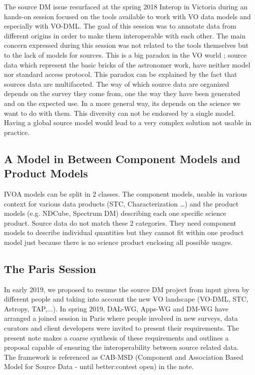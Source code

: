 \documentclass[11pt,a4paper]{ivoa}
\begin{document}
The source DM issue resurfaced at the spring 2018 Interop in Victoria during an hands-on session focused on the tools available to work with VO data models and especially with VO-DML. The goal of this session was to annotate data from different origins in order to make them interoperable with each other. The main concern expressed during this session was not related to the tools themselves but to the lack of models for sources. 
This is a big paradox in the VO world ; source data which represent the basic bricks of the astronomer work, have neither model nor standard access protocol. This paradox can be explained by the fact that sources data are multifaceted. The way of which source data are organized depends on the survey they come from, one the way they have been generated  and on the expected use. In a more general way, its depends on the science we want to do with them. This diversity can not be endorsed by a single model. Having a global source model would lead to a very complex solution not usable in practice.

\subsection{A Model in Between Component Models and Product Models}
IVOA models can be split in 2 classes. The component models, usable in various context for various data products (STC, Characterization \dots) and the product models (e.g. NDCube, Spectrum DM) describing each one specific science product.
Source data do not match these 2 categories. They need component models to describe individual quantities but they cannot fit within one product model just because there is no science product enclosing all possible usages. 

\subsection{The Paris Session}
In early 2019, we proposed to resume the source DM project from input given by different people and taking into account the new VO landscape (VO-DML, STC, Astropy, TAP,...). In spring 2019, DAL-WG, Apps-WG and DM-WG have arranged a joined session in Paris where people involved in new surveys, data curators and client developers were invited to present their requirements.
The present note makes a coarse synthesis of these requirements and outlines a proposal capable of ensuring the interoperability between source related data. 
The framework is referenced as CAB-MSD (Component and Association Based Model for Source Data  - until better:contest open) in the note.  
\end{document}
